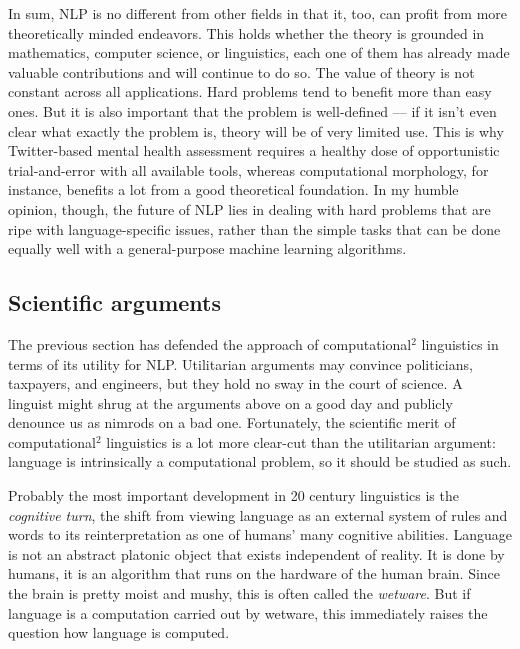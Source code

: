 In sum, NLP is no different from other fields in that it, too, can profit from more theoretically minded endeavors.
This holds whether the theory is grounded in mathematics, computer science, or linguistics, each one of them has already made valuable contributions and will continue to do so.
The value of theory is not constant across all applications.
Hard problems tend to benefit more than easy ones.
But it is also important that the problem is well-defined --- if it isn't even clear what exactly the problem is, theory will be of very limited use.
This is why Twitter-based mental health assessment requires a healthy dose of opportunistic trial-and-error with all available tools, whereas computational morphology, for instance, benefits a lot from a good theoretical foundation.
In my humble opinion, though, the future of NLP lies in dealing with hard problems that are ripe with language-specific issues, rather than the simple tasks that can be done equally well with a general-purpose machine learning algorithms.

\subsection{Scientific arguments}

The previous section has defended the approach of computational$^2$ linguistics in terms of its utility for NLP\@. 
Utilitarian arguments may convince politicians, taxpayers, and engineers, but they hold no sway in the court of science.
A linguist might shrug at the arguments above on a good day and publicly denounce us as nimrods on a bad one.
Fortunately, the scientific merit of computational$^2$ linguistics is a lot more clear-cut than the utilitarian argument: language is intrinsically a computational problem, so it should be studied as such.

Probably the most important development in 20 century linguistics is the \emph{cognitive turn}, the shift from viewing language as an external system of rules and words to its reinterpretation as one of humans' many cognitive abilities.
Language is not an abstract platonic object that exists independent of reality.
It is done by humans, it is an algorithm that runs on the hardware of the human brain.
Since the brain is pretty moist and mushy, this is often called the \emph{wetware}.
But if language is a computation carried out by wetware, this immediately raises the question how language is computed.

